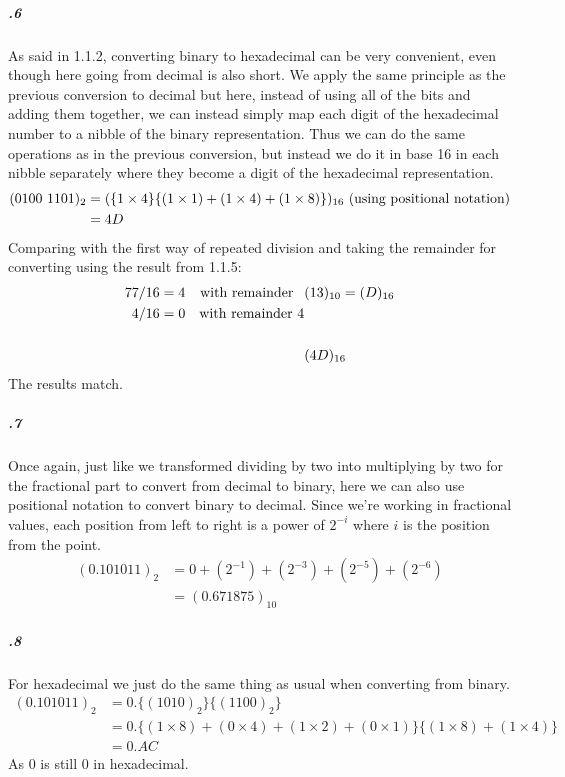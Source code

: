 \documentclass[11pt,letterpaper]{article}
\begin{document}
		\subparagraph{.6}
		As said in 1.1.2, converting binary to hexadecimal can be very convenient, even though here going from decimal is also short. We apply the same principle as the previous conversion to decimal but here, instead of using all of the bits and adding them together, we can instead simply map each digit of the hexadecimal number to a nibble of the binary representation. Thus we can do the same operations as in the previous conversion, but instead we do it in base 16 in each nibble separately where they become a digit of the hexadecimal representation.
		\begin{align*}
		(0100\ 1101)_2 &= (\{1 \times 4\}\{(1 \times 1) + (1 \times 4) + (1 \times 8)\})_{16}\textnormal{ (using positional notation)}\\
		&= 4D
		\end{align*}
		Comparing with the first way of repeated division and taking the remainder for converting using the result from 1.1.5:
		\begin{align*}
		77 / 16 &= 4&\textnormal{with remainder\;\;\:}&(13)_{10} = (D)_{16}\\
		 4 / 16 &= 0&\textnormal{with remainder 4}&\\
		\\
		&&&(4D)_{16}
		\end{align*}
		The results match.
		
		\subparagraph{.7}
		Once again, just like we transformed dividing by two into multiplying by two for the fractional part to convert from decimal to binary, here we can also use positional notation to convert binary to decimal. Since we're working in fractional values, each position from left to right is a power of $2^{-i}$ where $i$ is the position from the point.
		\begin{align*}
		(0.101011)_2 &= 0 + (2^{-1}) + (2^{-3}) + (2^{-5}) + (2^{-6})\\
		&= (0.671875)_{10}
		\end{align*}
		
		\subparagraph{.8}
		For hexadecimal we just do the same thing as usual when converting from binary.
		\begin{align*}
		(0.101011)_2 &= 0.\{(1010)_2\}\{(1100)_2\}\\
		&= 0.\{(1 \times 8) + (0 \times 4) + (1 \times 2) + (0 \times 1)\}\{(1 \times 8) + (1 \times 4)\}\\
		&= 0.AC
		\end{align*}
		As 0 is still 0 in hexadecimal.
		
\end{document}

